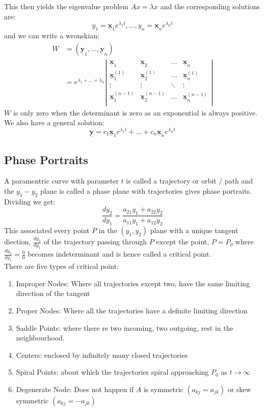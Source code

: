 \documentclass{article}
\renewcommand{\vec}[1]{\underline{\textbf{#1}}}
\newcommand{\fd}[2]{\frac{d #1}{d #2}}
\renewcommand{\l}{\lambda}
\begin{document}
This then yields the eigenvalue problem $Ax = \l x$ and the corresponding solutions are:
$$ y_1 = \vec x_1 e^{\l_1 t}, \dots, y_n = \vec x_n e^{\l_n t} $$
and we can write a wronskian:
\begin{align*}
  W &= (\vec y_1, \dots, \vec y_n) \\
  &=
  e^{\l_1+\dots+\l_n}\left|\begin{matrix}
    \vec x_1 & \vec x_2 & \dots & \vec x_n \\
    \vec x_1^{(1)} & \vec x_2^{(1)} & \dots & \vec x_n^{(1)} \\
    \vdots & \vdots & \ddots & \vdots \\
    \vec x_1^{(n-1)} & \vec x_2^{(n-1)} & \dots & \vec x_n^{(n-1)} \\
  \end{matrix}\right|
\end{align*}
$W$ is only zero when the determinant is zero as an exponential is always positive. We also have a general solution:
$$ \vec y = c_1\vec x_1 e^{\l_1 t} + \dots + c_n\vec x_n e^{\l_n t} $$

\subsection{Phase Portraits}
A paramentric curve with parameter $t$ is called a trajectory or orbit / path and the $y_1-y_2$ plane is called a phase plane with trajectories gives phase portraits. Dividing we get:
$$ \fd{y_2}{y_1} = \frac{a_{21}y_1 + a_{22}y_2}{a_{11}y_1 + a_{12}y_2} $$
This associated every point $P$ in the $(y_1, y_2)$ plane with a unique tangent diection, $\displaystyle{\fd{y_2}{y_1}}$ of the trajectory passing through $P$ except the point, $P = P_0$ where $\displaystyle{\fd{y_2}{y_1} = \frac{0}{0}}$ becomes indeterminant and is hence called a critical point.\\

There are five types of critical point:
\begin{enumerate}
  \item Improper Nodes: Where all trajectories except two, have the same limiting direction of the tangent
  \item Proper Nodes: Where all the trajectories have a definite limiting direction
  \item Saddle Points: where there re two incoming, two outgoing, rest in the neighbourhood.
  \item Centers: enclosed by infinitely many closed trajectories
  \item Spiral Points: about which the trajectories spiral approaching $P_0$ as $t\to \infty$
  \item Degenerate Node: Does not happen if $A$ is symmetric $(a_{kj} = a_{jk})$ or skew symmetric $(a_{kj} = -a_{jk})$
\end{enumerate}
\end{document}
